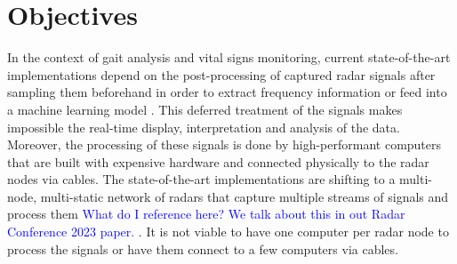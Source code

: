 \section{Objectives}

	In the context of gait analysis and vital signs monitoring, current state-of-the-art implementations \cite{Antolinos2020,Biase2020,Zanardi2021,Seifert2019, Iyer2022, Amin2017} depend on the post-processing of captured radar signals after sampling them beforehand in order to extract frequency information \cite{Antolinos2020, Seifert2019} or feed into a machine learning model \cite{Iyer2022}. This deferred treatment of the signals makes impossible the real-time display, interpretation and analysis of the data. Moreover, the processing of these signals is done by high-performant computers that are built with expensive hardware and connected physically to the radar nodes via cables. The state-of-the-art implementations are shifting to a multi-node, multi-static network of radars that capture multiple streams of signals and process them \textcolor{blue}{What do I reference here? We talk about this in out Radar Conference 2023 paper.} . It is not viable to have one computer per radar node to process the signals or have them connect to a few computers via cables.

